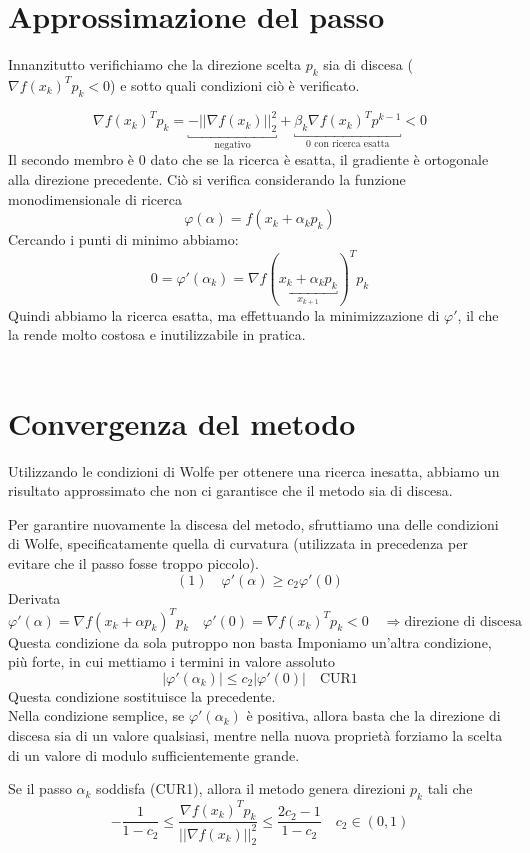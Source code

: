 \section{Approssimazione del passo}

Innanzitutto verifichiamo che la direzione scelta $p_{k}$ sia di
discesa ($\nabla f(x_{k})^{T} p_{k} < 0$) e sotto quali condizioni ciò
\`e verificato.

$$ \nabla f(x_{k})^{T} p_{k} = \underbracket{- || \nabla f(x_{k})||_{2}^{2}}_{\text{negativo}} + 
    \underbracket{\beta_{k} \nabla f(x_{k})^{T} p^{k-1}}_{\text{0 con
ricerca esatta}} < 0
$$
Il secondo membro \`e 0 dato che se la ricerca \`e esatta, il gradiente \`e
ortogonale alla direzione precedente. Ciò si verifica considerando la
funzione monodimensionale di ricerca
$$ \varphi(\alpha) = f(x_{k}+ \alpha_k p_{k})$$
Cercando i punti di minimo abbiamo:
$$ 0 = \varphi'(\alpha_{k}) = \nabla f(\underbracket{x_{k} + \alpha_{k}p_{k}}_{x_{k+1}})^{T} p_{k}$$
Quindi abbiamo la ricerca esatta, ma effettuando la minimizzazione di
$\varphi'$, il che la rende molto costosa e inutilizzabile in pratica.
\\ \\

\section{Convergenza del metodo} 
Utilizzando le condizioni di Wolfe
per ottenere una ricerca inesatta, abbiamo un risultato approssimato
che non ci garantisce che il metodo sia di discesa.

Per garantire nuovamente la discesa del metodo, sfruttiamo una delle
condizioni di Wolfe, specificatamente quella di curvatura (utilizzata
in precedenza per evitare che il passo fosse troppo piccolo).
$$(1) \quad  \varphi'( \alpha ) \geq c_2 \varphi'(0)$$
Derivata
$$\varphi'(\alpha) = \nabla f(x_{k} + \alpha p_{k})^{T} p_{k} \quad
 \varphi'(0) = \nabla f(x_{k})^{T} p_{k} < 0 \quad \Rightarrow \text{
direzione di discesa} $$ Questa condizione da sola putroppo non basta
Imponiamo un'altra condizione, più forte, in cui mettiamo i termini in
valore assoluto
 $$ | \varphi'(\alpha_{k})| \leq c_{2} | \varphi'(0) | \quad \text{CUR1}$$
Questa condizione sostituisce la precedente.  \\ Nella condizione
semplice, se $\varphi'(\alpha_{k}) $ \`e positiva, allora basta che la
direzione di discesa sia di un valore qualsiasi, mentre nella nuova
proprietà forziamo la scelta di un valore di modulo sufficientemente
grande.
\begin{lemma}
\label{lemma:coniugatocur1} Se il passo $\alpha_{k}$ soddisfa (CUR1), allora il
metodo genera direzioni $p_{k}$ tali che
$$ 
-\frac{1}{1-c_{2}} \leq \frac{\nabla f(x_{k})^{T} p_{k} }{||\nabla
f(x_{k})||_{2}^{2}} \leq \frac{2 c_{2} -1 }{1-c_{2}} \quad c_{2} \in (0,1)
$$
\end{lemma}

